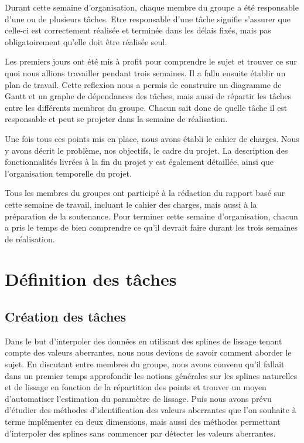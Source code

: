 \documentclass[a4paper,10pt]{article} %
\begin{document}
Durant cette semaine d'organisation, chaque membre du groupe a été responsable d’une ou de plusieurs tâches. Etre responsable d'une tâche signifie s'assurer que celle-ci est correctement réalisée et terminée dans les délais fixés, mais pas obligatoirement qu'elle doit être réalisée seul.

Les premiers jours ont été mis à profit pour comprendre le sujet et trouver ce sur quoi nous allions travailler pendant trois semaines. Il a fallu ensuite établir un plan de travail. Cette reflexion nous a permis de construire un diagramme de Gantt et un graphe de dépendances des tâches, mais aussi de répartir les tâches entre les différents membres du groupe. Chacun sait donc de quelle tâche il est responsable et peut se projeter dans la semaine de réalisation.

Une fois tous ces points mis en place, nous avons établi le cahier de charges. Nous y avons décrit le problème, nos objectifs, le cadre du projet. La description des fonctionnalités livrées à la fin du projet y est également détaillée, ainsi que l'organisation temporelle du projet. 

Tous les membres du groupes ont participé à la rédaction du rapport basé sur cette semaine de travail, incluant le cahier des charges, mais aussi à la préparation de la soutenance. Pour terminer cette semaine d'organisation, chacun a pris le temps de bien comprendre ce qu'il devrait faire durant les trois semaines de réalisation. 



\section{Définition des tâches}

	\subsection{Création des tâches}
	Dans le but d'interpoler des données en utilisant des splines de lissage tenant compte des valeurs aberrantes, nous nous devions de savoir comment aborder le sujet. En discutant entre membres du groupe, nous avons convenu qu'il fallait dans un premier temps approfondir les notions générales sur les splines naturelles et de lissage en fonction de la répartition des points et trouver un moyen d'automatiser l'estimation du paramètre de lissage. Puis nous avons prévu d'étudier des méthodes d'identification des valeurs aberrantes que l'on souhaite à terme implémenter en deux dimensions, mais aussi des méthodes permettant d'interpoler des splines sans commencer par détecter les valeurs aberrantes.
\end{document}
